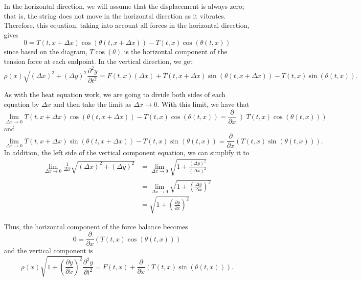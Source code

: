 \documentclass{ximera}
\begin{document}
In the horizontal direction, we will assume that the displacement is always zero; that is, the string does not move in the horizontal direction as it vibrates. Therefore, this equation, taking into account all forces in the horizontal direction, gives
\[ 
    0 = T(t, x + \Delta x)  \cos(\theta(t, x + \Delta x)) - T(t, x) \cos(\theta(t, x)) 
\] 
since based on the diagram, $T\cos(\theta)$ is the horizontal component of the tension force at each endpoint. In the vertical direction, we get
\[ 
    \rho(x) \sqrt{(\Delta x)^2 + (\Delta y)^2} \frac{\partial^2 y}{\partial t^2} = F(t,x) (\Delta x) + T(t, x + \Delta x)  \sin(\theta(t, x + \Delta x)) - T(t, x) \sin(\theta(t, x)) .
\]

As with the heat equation work, we are going to divide both sides of each equation by $\Delta x$ and then take the limit as $\Delta x \rightarrow 0$. With this limit, we have that
\[ 
    \lim_{\Delta x \rightarrow 0} T(t, x + \Delta x)  \cos(\theta(t, x + \Delta x)) - T(t, x) \cos(\theta(t, x)) = \frac{\partial}{\partial x} \left) T(t, x)\cos(\theta(t, x))\right) 
\] 
and 
\[ 
    \lim_{\Delta x \rightarrow 0} T(t, x + \Delta x)  \sin(\theta(t, x + \Delta x)) - T(t, x) \sin(\theta(t, x)) = \frac{\partial}{\partial x} \left( T(t, x)\sin(\theta(t, x))\right). 
\] 
In addition, the left side of the vertical component equation, we 
can simplify it to
\[ 
    \begin{split}
        \lim_{\Delta x \rightarrow 0} \frac{1}{\Delta x} \sqrt{(\Delta x)^2 + (\Delta y)^2} &= \lim_{\Delta x \rightarrow 0} \sqrt{1 + \frac{(\Delta y)^2}{(\Delta x)^2}} \\
        &= \lim_{\Delta x \rightarrow 0} \sqrt{1 + \left(\frac{\Delta y}{\Delta x}\right)^2} \\
        &= \sqrt{1 + \left(\frac{\partial y}{\partial x}\right)^2}
    \end{split}
\]

Thus, the horizontal component of the force balance becomes
\[ 
    0 =  \frac{\partial}{\partial x} \left(T(t, x)\cos(\theta(t, x))\right) 
\] 
and the vertical component is
\[ 
    \rho(x) \sqrt{1 + \left(\frac{\partial y}{\partial x} \right)^2} \frac{\partial^2 y}{\partial t^2} = F(t,x) +\frac{\partial}{\partial x} \left(T(t, x)\sin(\theta(t, x))\right). 
\]
\end{document}
